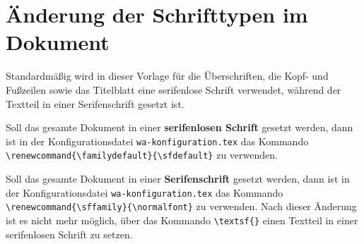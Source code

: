 \section{\"Anderung der Schrifttypen im Dokument}

Standardm\"a{\ss}ig wird in dieser Vorlage f\"ur die \"Uberschriften, die Kopf- und Fu{\ss}zeilen 
sowie das Titelblatt eine serifenlose Schrift verwendet, w\"ahrend der Textteil in einer Serifenschrift 
gesetzt ist.

Soll das gesamte Dokument in einer \textsf{\textbf{serifenlosen Schrift}} gesetzt werden, dann ist in 
der Konfigurationsdatei \verb+wa-konfiguration.tex+ das Kommando \newline
\hspace*{\fill}\verb+\renewcommand{\familydefault}{\sfdefault}+\hspace*{\fill}\newline
zu verwenden.

Soll das gesamte Dokument in einer \textbf{Serifenschrift} gesetzt werden, dann ist in 
der Konfigurationsdatei \verb+wa-konfiguration.tex+ das Kommando \newline
\hspace*{\fill}\verb+\renewcommand{\sffamily}{\normalfont}+\hspace*{\fill}\newline
zu verwenden. Nach dieser \"Anderung ist es nicht mehr m\"oglich, \"uber das 
Kommando \verb+\textsf{}+ einen Textteil in einer serifenlosen Schrift zu setzen.


